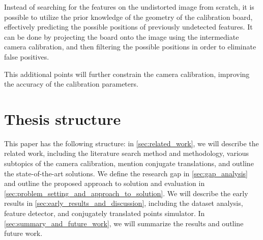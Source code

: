 Instead of searching for the features on the undistorted image from scratch, it
is possible to utilize the prior knowledge of the geometry of the calibration
board, effectively predicting the possible positions of previously undetected
features. It can be done by projecting the board onto the image using the
intermediate camera calibration, and then filtering the possible positions in
order to eliminate false positives.

This additional points will further constrain the camera calibration, improving
the accuracy of the calibration parameters.

\section{Thesis structure}\label{sec:thesis_structure}

This paper has the following structure: in \autoref{sec:related_work}, we will describe the related work, including the
literature search method and methodology, various subtopics of the camera
calibration, mention conjugate translations, and outline the state-of-the-art
solutions. We define the research gap in \autoref{sec:gap_analysis} and outline
the proposed approach to solution and evaluation in
\autoref{sec:problem_setting_and_approach_to_solution}. We will describe the
early results in \autoref{sec:early_results_and_discussion}, including the
dataset analysis, feature detector, and conjugately translated points simulator.
In \autoref{sec:summary_and_future_work}, we will summarize the results and
outline future work.

\endinput


